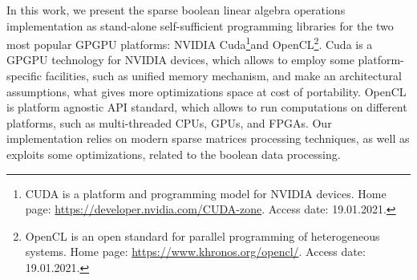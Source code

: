 In this work, we present the sparse boolean linear algebra operations implementation as stand-alone self-sufficient programming libraries for the two most popular GPGPU platforms: NVIDIA Cuda\footnote{CUDA is a platform and programming model for NVIDIA devices. Home page: \url{https://developer.nvidia.com/CUDA-zone}. Access date: 19.01.2021.}and OpenCL\footnote{OpenCL is an open standard for parallel programming of heterogeneous systems. Home page: \url{https://www.khronos.org/opencl/}. Access date: 19.01.2021.}.
Cuda is a GPGPU technology for NVIDIA devices, which allows to employ some platform-specific facilities, such as unified memory mechanism, and make an architectural assumptions, what gives more optimizations space at cost of portability. 
OpenCL is platform agnostic API standard, which allows to run computations on different platforms, such as multi-threaded CPUs, GPUs, and FPGAs.
Our implementation relies on modern sparse matrices processing techniques, as well as exploits some optimizations, related to the boolean data processing.